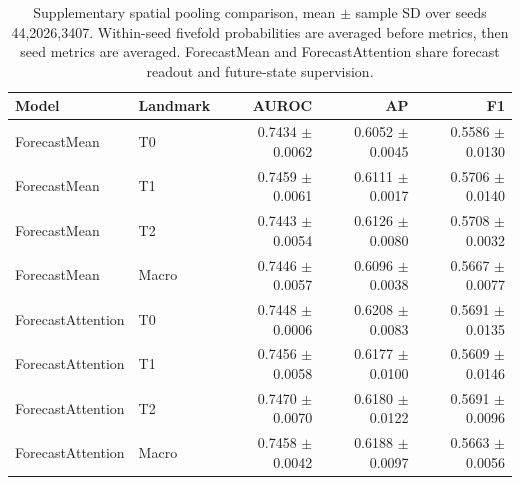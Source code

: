 \begin{table}[t]
\centering
\small
\caption{Supplementary spatial pooling comparison, mean $\pm$ sample SD over seeds 44,2026,3407. Within-seed fivefold probabilities are averaged before metrics, then seed metrics are averaged. ForecastMean and ForecastAttention share forecast readout and future-state supervision.}
\label{tab:pooling}
\begin{tabular}{llrrr}
\toprule
Model & Landmark & AUROC & AP & F1 \\
\midrule
ForecastMean & T0 & 0.7434 $\pm$ 0.0062 & 0.6052 $\pm$ 0.0045 & 0.5586 $\pm$ 0.0130 \\
ForecastMean & T1 & 0.7459 $\pm$ 0.0061 & 0.6111 $\pm$ 0.0017 & 0.5706 $\pm$ 0.0140 \\
ForecastMean & T2 & 0.7443 $\pm$ 0.0054 & 0.6126 $\pm$ 0.0080 & 0.5708 $\pm$ 0.0032 \\
ForecastMean & Macro & 0.7446 $\pm$ 0.0057 & 0.6096 $\pm$ 0.0038 & 0.5667 $\pm$ 0.0077 \\
ForecastAttention & T0 & 0.7448 $\pm$ 0.0006 & 0.6208 $\pm$ 0.0083 & 0.5691 $\pm$ 0.0135 \\
ForecastAttention & T1 & 0.7456 $\pm$ 0.0058 & 0.6177 $\pm$ 0.0100 & 0.5609 $\pm$ 0.0146 \\
ForecastAttention & T2 & 0.7470 $\pm$ 0.0070 & 0.6180 $\pm$ 0.0122 & 0.5691 $\pm$ 0.0096 \\
ForecastAttention & Macro & 0.7458 $\pm$ 0.0042 & 0.6188 $\pm$ 0.0097 & 0.5663 $\pm$ 0.0056 \\
\bottomrule
\end{tabular}
\end{table}

